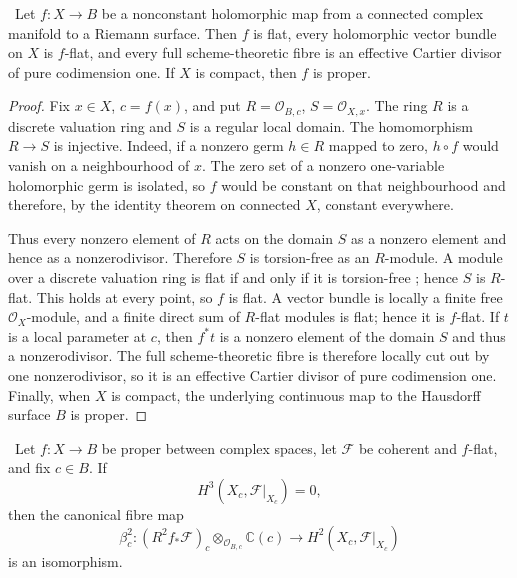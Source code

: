 \begin{lemma}
\label{lem:curve-flatness}
\Verified\ Let $f:X\to B$ be a nonconstant holomorphic map from a connected
complex manifold to a Riemann surface.  Then $f$ is flat, every holomorphic
vector bundle on $X$ is $f$-flat, and every full scheme-theoretic fibre is an
effective Cartier divisor of pure codimension one.  If $X$ is compact, then
$f$ is proper.
\end{lemma}

\begin{proof}
Fix $x\in X$, $c=f(x)$, and put
$R=\mathcal O_{B,c}$, $S=\mathcal O_{X,x}$.  The ring $R$ is a discrete
valuation ring and $S$ is a regular local domain.  The homomorphism
$R\to S$ is injective.  Indeed, if a nonzero germ $h\in R$ mapped to zero,
$h\circ f$ would vanish on a neighbourhood of $x$.  The zero set of a
nonzero one-variable holomorphic germ is isolated, so $f$ would be constant
on that neighbourhood and therefore, by the identity theorem on connected
$X$, constant everywhere.

Thus every nonzero element of $R$ acts on the domain $S$ as a nonzero
element and hence as a nonzerodivisor.  Therefore $S$ is torsion-free as an
$R$-module.  A module over a discrete valuation ring is flat if and only if
it is torsion-free \cite[Tag~0AUW]{StacksProject}; hence $S$ is $R$-flat.
This holds at every point, so $f$ is flat.  A vector bundle is locally a
finite free $\mathcal O_X$-module, and a finite direct sum of $R$-flat
modules is flat; hence it is $f$-flat.  If $t$ is a local parameter at
$c$, then $f^*t$ is a nonzero element of the domain $S$ and thus a
nonzerodivisor.  The full scheme-theoretic fibre is therefore locally cut
out by one nonzerodivisor, so it is an effective Cartier divisor of pure
codimension one.  Finally, when $X$ is compact, the underlying continuous
map to the Hausdorff surface $B$ is proper.
\end{proof}

\begin{proposition}
\label{prop:analytic-base-change}
\Verified\ Let $f:X\to B$ be proper between complex spaces, let
$\mathcal F$ be coherent and $f$-flat, and fix $c\in B$.  If
\[
H^3(X_c,\mathcal F|_{X_c})=0,
\tag{5.16}
\]
then the canonical fibre map
\[
\beta_c^2:
(R^2f_*\mathcal F)_c\otimes_{\mathcal O_{B,c}}\mathbb C(c)
\longrightarrow H^2(X_c,\mathcal F|_{X_c})
\tag{5.17}
\]
is an isomorphism.
\end{proposition}

